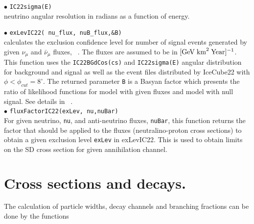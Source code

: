 \documentclass[12pt,a4paper]{article}
\begin{document}
 \noindent 
$\bullet$ \verb|IC22sigma(E)|\\
neutrino angular resolution in radians  as a function of energy. 

\noindent
$\bullet$ \verb|exLevIC22( nu_flux, nuB_flux,&B)|\\
 calculates the  exclusion confidence  level  for number of signal events 
generated by  given $\nu_{\mu}$ and  
$\bar{\nu}_{\mu}$  fluxes, ~\cite{Belanger:2015hra}. The fluxes are assumed to be in
$[\rm{GeV\;km}^2\;\rm{Year}]^{-1}$.  This function uses
the \verb|IC22BGdCos(cs)| and \verb|IC22sigma(E)| angular distribution for background and 
signal as well as the event files distributed  by IceCube22 
with  $\phi<\phi_{cut}=8^{\circ} $.  The returned parameter \verb|B| is a
Basyan  factor which presents the ratio of likelihood functions for  model
with  given fluxes and model  with null signal.  See details in ~\cite{Belanger:2015hra}.\\
\noindent  
$\bullet$ \verb|fluxFactorIC22(exLev, nu,nuBar)|\\
For given neutrino, \verb|nu|, and anti-neutrino fluxes, \verb|nuBar|, 
this function returns the factor that should be applied to the 
fluxes (neutralino-proton   cross sections)  to obtain a given exclusion
level {\tt exLev}  in exLevIC22. This is used to obtain  limits on the SD cross 
section for given annihilation channel.

\section{Cross sections and decays.}
\label{cross_section}

The calculation of particle widths, decay channels  and branching fractions
can be done by the functions\\
\end{document}
